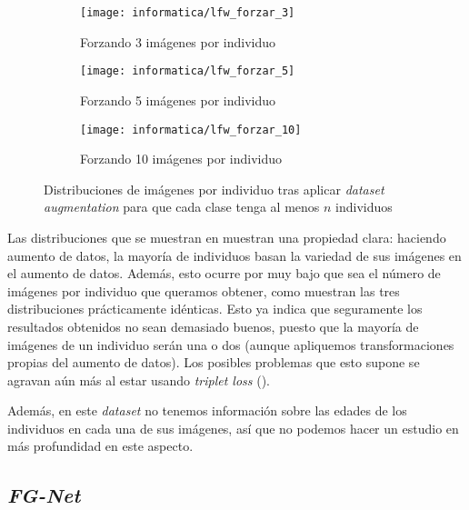\begin{figure}[H]
\centering
    \begin{subfigure}{0.5\textwidth}
        \centering
        \texttt{[image: informatica/lfw\_forzar\_3]}
        \caption{Forzando 3 imágenes por individuo }
    \end{subfigure}%
    \begin{subfigure}{.5\textwidth}
        \centering
        \texttt{[image: informatica/lfw\_forzar\_5]}
        \caption{Forzando 5 imágenes por individuo}
    \end{subfigure}

    \begin{subfigure}{.5\textwidth}
        \centering
        \texttt{[image: informatica/lfw\_forzar\_10]}
        \caption{Forzando 10 imágenes por individuo }
    \end{subfigure}

    \caption{Distribuciones de imágenes por individuo tras aplicar \textit{dataset augmentation} para que cada clase tenga al menos $n$ individuos}
    \label{img:distribuciones_forzar_data_augmentation}
\end{figure}

Las distribuciones que se muestran en  muestran una propiedad clara: haciendo aumento de datos, la mayoría de individuos basan la variedad de sus imágenes en el aumento de datos. Además, esto ocurre por muy bajo que sea el número de imágenes por individuo que queramos obtener, como muestran las tres distribuciones prácticamente idénticas. Esto ya indica que seguramente los resultados obtenidos no sean demasiado buenos, puesto que la mayoría de imágenes de un individuo serán una o dos  (aunque apliquemos transformaciones propias del aumento de datos). Los posibles problemas que esto supone se agravan aún más al estar usando \textit{triplet loss} ().

Además, en este \textit{dataset} no tenemos información sobre las edades de los individuos en cada una de sus imágenes, así que no podemos hacer un estudio en más profundidad en este aspecto.

\subsection{\textit{FG-Net}} \label{isec:fgnet}


